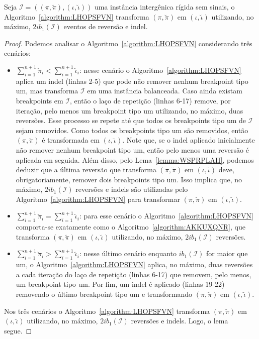 \begin{lemma}\label{lemma:XUDIVWPC}
Seja $\mathcal{I}=((\pi,\breve\pi),(\iota,\breve\iota))$ uma instância intergênica rígida sem sinais, o Algoritmo~\ref{algorithm:LHOPSFVN} transforma $(\pi,\breve\pi)$ em $(\iota,\breve\iota)$ utilizando, no máximo, $2ib_1(\mathcal{I})$ eventos de reversão e indel.
\end{lemma}
\begin{proof}
  Podemos analisar o Algoritmo~\ref{algorithm:LHOPSFVN} considerando três cenários:
  \begin{itemize}
    \item $\sum_{i=1}^{n+1}\breve\pi_i < \sum_{i=1}^{n+1}\breve\iota_i$: nesse cenário o Algoritmo~\ref{algorithm:LHOPSFVN} aplica um indel (linhas 2-5) que pode não remover nenhum breakpoint tipo um, mas transforma $\mathcal{I}$ em uma instância balanceada. Caso ainda existam breakpoints em $\mathcal{I}$, então o laço de repetição (linhas 6-17) remove, por iteração, pelo menos um breakpoint tipo um utilizando, no máximo, duas reversões. Esse processo se repete até que todos os breakpoints tipo um de $\mathcal{I}$ sejam removidos. Como todos os breakpoints tipo um são removidos, então $(\pi,\breve\pi)$ é transformada em $(\iota,\breve\iota)$. Note que, se o indel aplicado inicialmente não remover nenhum breakpoint tipo um, então pelo menos uma reversão é aplicada em seguida. Além disso, pelo Lema~\ref{lemma:WSPRPLAH}, podemos deduzir que a última reversão que transforma $(\pi,\breve\pi)$ em $(\iota,\breve\iota)$ deve, obrigatoriamente, remover dois breakpoints tipo um. Isso implica que, no máximo, $2ib_1(\mathcal{I})$ reversões e indels são utilizadas pelo Algoritmo~\ref{algorithm:LHOPSFVN} para transformar $(\pi,\breve\pi)$ em $(\iota,\breve\iota)$.
    \item $\sum_{i=1}^{n+1}\breve\pi_i = \sum_{i=1}^{n+1}\breve\iota_i$: para esse cenário o Algoritmo~\ref{algorithm:LHOPSFVN} comporta-se exatamente como o Algoritmo~\ref{algorithm:AKKUXQNR}, que transforma $(\pi,\breve\pi)$ em $(\iota,\breve\iota)$ utilizando, no máximo, $2ib_1(\mathcal{I})$ reversões.
    \item $\sum_{i=1}^{n+1}\breve\pi_i > \sum_{i=1}^{n+1}\breve\iota_i$: nesse último cenário enquanto $ib_1(\mathcal{I})$ for maior que um, o Algoritmo~\ref{algorithm:LHOPSFVN} aplica, no máximo, duas reversões a cada iteração do laço de repetição (linhas 6-17) que removem, pelo menos, um breakpoint tipo um. Por fim, um indel é aplicado (linhas 19-22) removendo o último breakpoint tipo um e transformando $(\pi,\breve\pi)$ em $(\iota,\breve\iota)$.
  \end{itemize}
  Nos três cenários o Algoritmo~\ref{algorithm:LHOPSFVN} transforma $(\pi,\breve\pi)$ em $(\iota,\breve\iota)$ utilizando, no máximo, $2ib_1(\mathcal{I})$ reversões e indels. Logo, o lema segue.
\end{proof}

